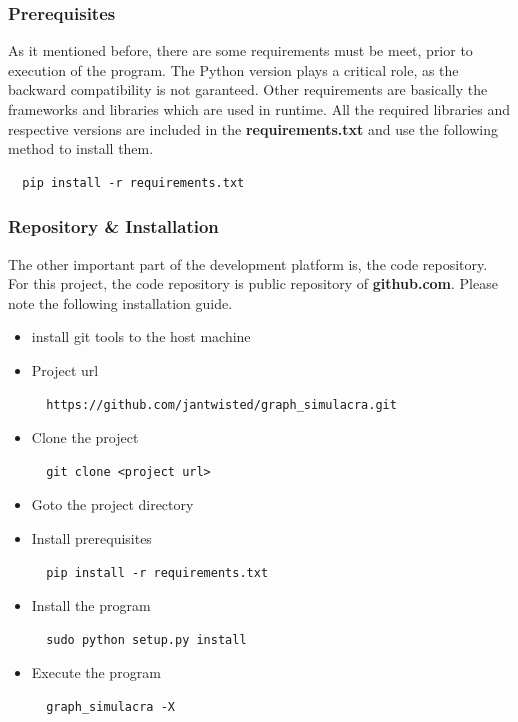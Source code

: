 \documentclass[11pt]{article}
\begin{document}
\subsubsection{Prerequisites}

As it mentioned before, there are some requirements must be meet, prior to execution of the program. The Python version plays a critical role, as the backward compatibility is not garanteed. Other requirements are basically the frameworks and libraries which are used in runtime. All the required libraries and respective versions are included in the \textbf{requirements.txt} and use the following method to install them.

\begin{lstlisting}
  pip install -r requirements.txt
\end{lstlisting}

\subsubsection{Repository \& Installation}

The other important part of the development platform is, the code repository. For this project, the code repository is public repository of \textbf{github.com}. Please note the following installation guide.

\begin{itemize}
	\item install git tools to the host machine
	\item Project url
\begin{lstlisting}
  https://github.com/jantwisted/graph_simulacra.git
\end{lstlisting}
	\item Clone the project
\begin{lstlisting}
  git clone <project url>
\end{lstlisting}
	\item Goto the project directory
	\item Install prerequisites
\begin{lstlisting}
  pip install -r requirements.txt
\end{lstlisting}
	\item Install the program
\begin{lstlisting}
  sudo python setup.py install
\end{lstlisting}
	\item Execute the program
\begin{lstlisting}
  graph_simulacra -X
\end{lstlisting}	
\end{itemize}
\end{document}
